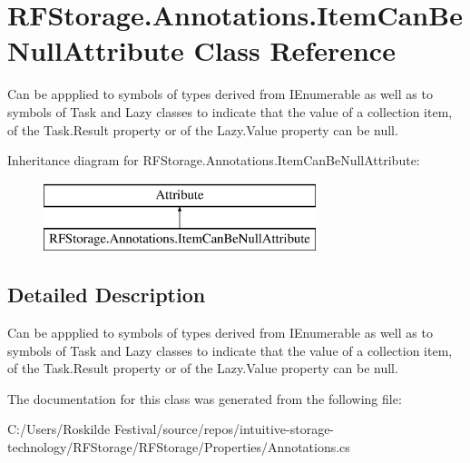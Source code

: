 \hypertarget{class_r_f_storage_1_1_annotations_1_1_item_can_be_null_attribute}{}\section{R\+F\+Storage.\+Annotations.\+Item\+Can\+Be\+Null\+Attribute Class Reference}
\label{class_r_f_storage_1_1_annotations_1_1_item_can_be_null_attribute}


Can be appplied to symbols of types derived from I\+Enumerable as well as to symbols of Task and Lazy classes to indicate that the value of a collection item, of the Task.\+Result property or of the Lazy.\+Value property can be null.  


Inheritance diagram for R\+F\+Storage.\+Annotations.\+Item\+Can\+Be\+Null\+Attribute\+:\begin{figure}[H]
\begin{center}
\leavevmode
\includegraphics[height=2.000000cm]{class_r_f_storage_1_1_annotations_1_1_item_can_be_null_attribute}
\end{center}
\end{figure}


\subsection{Detailed Description}
Can be appplied to symbols of types derived from I\+Enumerable as well as to symbols of Task and Lazy classes to indicate that the value of a collection item, of the Task.\+Result property or of the Lazy.\+Value property can be null. 



The documentation for this class was generated from the following file\+:\begin{DoxyCompactItemize}
\item 
C\+:/\+Users/\+Roskilde Festival/source/repos/intuitive-\/storage-\/technology/\+R\+F\+Storage/\+R\+F\+Storage/\+Properties/Annotations.\+cs\end{DoxyCompactItemize}
